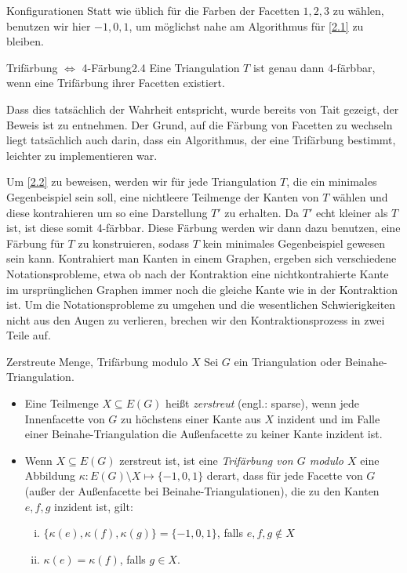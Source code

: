 \begin{section}{Konfigurationen}
 Statt wie üblich für die Farben der Facetten $1,2,3$ zu wählen, benutzen wir hier $-1,0,1$, um möglichst nahe am Algorithmus für \ref{2.1} zu bleiben.
 
 \begin{satzl}{Trifärbung $\Leftrightarrow$ 4-Färbung}{2.4}
  Eine Triangulation $T$ ist genau dann 4-färbbar, wenn eine Trifärbung ihrer Facetten existiert.
 \end{satzl}
 
 Dass dies tatsächlich der Wahrheit entspricht, wurde bereits von Tait gezeigt, der Beweis ist \cite{TaitTri} zu entnehmen. Der Grund, auf die Färbung von Facetten zu wechseln liegt tatsächlich auch darin, dass ein Algorithmus, der eine Trifärbung bestimmt, leichter zu implementieren war. \cite[Seite 7]{FourRSST} 
 
 Um \ref{2.2} zu beweisen, werden wir für jede Triangulation $T$, die ein minimales Gegenbeispiel sein soll, eine nichtleere Teilmenge der Kanten von $T$ wählen und diese kontrahieren um so eine Darstellung $T'$ zu erhalten. Da $T'$ echt kleiner als $T$ ist, ist diese somit 4-färbbar. Diese Färbung werden wir dann dazu benutzen, eine Färbung für $T$ zu konstruieren, sodass $T$ kein minimales Gegenbeispiel gewesen sein kann. Kontrahiert man Kanten in einem Graphen, ergeben sich verschiedene Notationsprobleme, etwa ob nach der Kontraktion eine nichtkontrahierte Kante im ursprünglichen Graphen immer noch die gleiche Kante wie in der Kontraktion ist. Um die Notationsprobleme zu umgehen und die wesentlichen Schwierigkeiten nicht aus den Augen zu verlieren, brechen wir den Kontraktionsprozess in zwei Teile auf. 
 
 \begin{definition}{Zerstreute Menge, Trifärbung modulo $X$}
 Sei $G$ ein Triangulation oder Beinahe-Triangulation. 
 \begin{itemize}
  \item Eine Teilmenge $X \subseteq E(G)$ heißt \textit{zerstreut} (engl.: sparse), wenn jede Innenfacette von $G$ zu höchstens einer Kante aus $X$ inzident und im Falle einer Beinahe-Triangulation die Außenfacette zu keiner Kante inzident ist.
  \item Wenn $X \subseteq E(G)$ zerstreut ist, ist eine \textit{Trifärbung von $G$ modulo $X$} eine Abbildung $\kappa: E(G) \setminus X \mapsto \{-1,0,1\}$ derart, dass für jede Facette von $G$ (außer der Außenfacette bei Beinahe-Triangulationen), die zu den Kanten $e,f,g$ inzident ist, gilt:
  \begin{enumerate}[(i)]
   \item $\{\kappa(e),\kappa(f),\kappa(g)\} = \{-1,0,1\}$, falls $e,f,g \not\in X$
   \item $\kappa(e) = \kappa(f)$, falls $g\in X$.
  \end{enumerate}
 \end{itemize}
 \end{definition}
 

\end{section}
